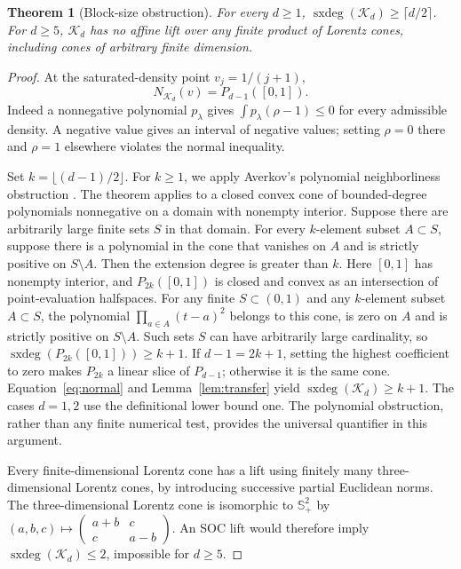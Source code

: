 \documentclass[pdflatex,sn-mathphys-num]{sn-jnl}
\theoremstyle{thmstyleone}
\newtheorem{theorem}{Theorem}
\theoremstyle{thmstyletwo}\newtheorem{remark}[theorem]{Remark}
\newcommand{\K}{\mathcal K}
\newcommand{\PSD}{\mathbb S_+}
\newcommand{\sxdeg}{\operatorname{sxdeg}}
\begin{document}
\begin{theorem}[Block-size obstruction]\label{thm:lower}
For every $d\ge1$, $\sxdeg(\K_d)\ge\lceil d/2\rceil$.
For $d\ge5$, $\K_d$ has no affine lift over any finite product of Lorentz
cones, including cones of arbitrary finite dimension.
\end{theorem}
\begin{proof}
At the saturated-density point $v_j=1/(j+1)$,
\begin{equation}\label{eq:normal}
 N_{\K_d}(v)=P_{d-1}([0,1]).
\end{equation}
Indeed a nonnegative polynomial $p_\lambda$ gives
$\int p_\lambda(\rho-1)\le0$ for every admissible density. A negative
value gives an interval of negative values; setting $\rho=0$ there and
$\rho=1$ elsewhere violates the normal inequality.

Set $k=\lfloor(d-1)/2\rfloor$. For $k\ge1$, we apply Averkov's polynomial
neighborliness obstruction \cite[Theorem 2, author-version numbering]{averkov}.
The theorem applies to a closed convex cone of bounded-degree polynomials
nonnegative on a domain with nonempty interior.
Suppose there are arbitrarily large finite sets $S$ in that domain.
For every $k$-element subset $A\subset S$, suppose there is a polynomial in
the cone that vanishes on $A$ and is strictly positive on $S\setminus A$.
Then the extension degree is greater than $k$.
Here $[0,1]$ has nonempty interior, and $P_{2k}([0,1])$ is closed and convex
as an intersection of point-evaluation halfspaces. For any finite
$S\subset(0,1)$ and any $k$-element subset $A\subset S$, the polynomial
$\prod_{a\in A}(t-a)^2$ belongs to this cone, is zero on $A$ and is strictly
positive on $S\setminus A$. Such sets $S$ can have arbitrarily large cardinality,
so $\sxdeg(P_{2k}([0,1]))\ge k+1$. If $d-1=2k+1$, setting the highest coefficient
to zero makes $P_{2k}$ a linear slice of $P_{d-1}$; otherwise it is the
same cone. Equation~\eqref{eq:normal} and Lemma~\ref{lem:transfer} yield
$\sxdeg(\K_d)\ge k+1$. The cases $d=1,2$ use the definitional lower bound
one. The polynomial obstruction, rather than any finite numerical test,
provides the universal quantifier in this argument.

Every finite-dimensional Lorentz cone has a lift using finitely many
three-dimensional Lorentz cones, by introducing successive partial
Euclidean norms. The three-dimensional Lorentz cone is isomorphic to $\PSD^2$ by
$(a,b,c)\mapsto\left(\begin{smallmatrix}a+b&c\\c&a-b\end{smallmatrix}\right)$.
An SOC lift would therefore imply $\sxdeg(\K_d)\le2$, impossible for
$d\ge5$.
\end{proof}
\end{document}

